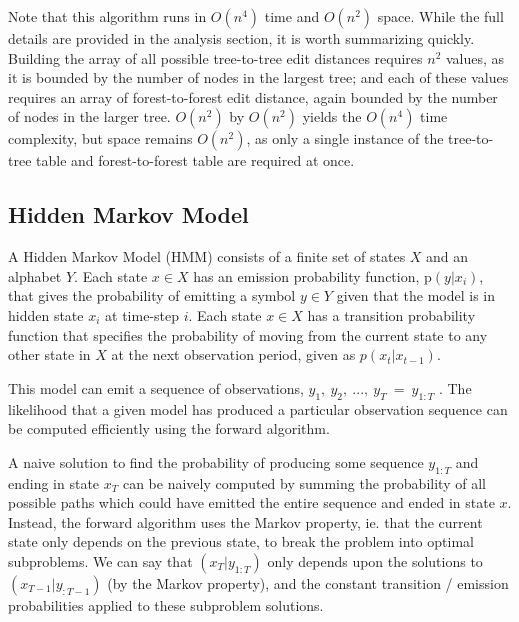 Note that this algorithm runs in $O(n^4)$ time and $O(n^2)$ space. While the full details are provided in the 
analysis section, it is worth summarizing quickly. Building the array of all possible tree-to-tree edit distances 
requires $n^2$ values, as it is bounded by the number of nodes in the largest tree; and each of these values requires
an array of forest-to-forest edit distance, again bounded by the number of nodes in the larger tree. $O(n^2)$ by $O(n^2)$
yields the $O(n^4)$ time complexity, but space remains $O(n^2)$, as only a single instance of the tree-to-tree table
and forest-to-forest table are required at once.


\subsection{Hidden Markov Model}

A Hidden Markov Model (HMM) consists of a finite set of states $X$ and an alphabet $Y$.
Each state $x \in X$ has an emission probability function, p$(y | x_i)$, that gives the probability of
emitting a symbol $y \in Y$ given that the model is in hidden state $x_i$ at time-step $i$. 
Each state $x \in X$ has a transition probability function
that specifies the probability of moving from the current state to any other state in
$X$ at the next observation period, given as $p(x_t | x_{t-1})$.

This model can emit a sequence of observations, $y_1,\ y_2,\ ...,\ y_T\ =\ y_{1:T}$ . The likelihood that a given
model has produced a particular observation sequence can be computed efficiently using
the forward algorithm.  

A naive solution to find the probability of producing some sequence $y_{1:T}$ and ending in state $x_T$ can be naively computed by summing the 
probability of all possible paths which could have emitted the entire sequence and ended in state $x$. Instead,
the forward algorithm uses the Markov property, ie. that the current state only depends on the previous state, to break the problem into optimal subproblems. 
We can say that $(x_T | y_{1:T})$ only depends upon the solutions to $(x_{T-1} | y_{:T-1})$ (by the Markov property), and the constant transition / emission probabilities 
applied to these subproblem solutions.


